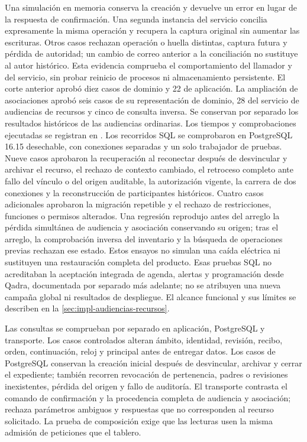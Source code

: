 Una simulación en memoria conserva la creación y devuelve un error en lugar de la respuesta de confirmación. Una segunda instancia del servicio concilia expresamente la misma operación y recupera la captura original sin aumentar las escrituras. Otros casos rechazan operación o huella distintas, captura futura y pérdida de autoridad; un cambio de correo anterior a la conciliación no sustituye al autor histórico. Esta evidencia comprueba el comportamiento del llamador y del servicio, sin probar reinicio de procesos ni almacenamiento persistente. El corte anterior aprobó diez casos de dominio y 22 de aplicación. La ampliación de asociaciones aprobó seis casos de su representación de dominio, 28 del servicio de audiencias de recursos y cinco de consulta inversa. Se conservan por separado los resultados históricos de las audiencias ordinarias. Los tiempos y comprobaciones ejecutadas se registran en . Los recorridos SQL se comprobaron en PostgreSQL 16.15 desechable, con conexiones separadas y un solo trabajador de pruebas. Nueve casos aprobaron la recuperación al reconectar después de desvincular y archivar el recurso, el rechazo de contexto cambiado, el retroceso completo ante fallo del vínculo o del origen auditable, la autorización vigente, la carrera de dos conexiones y la reconstrucción de participantes históricos. Cuatro casos adicionales aprobaron la migración repetible y el rechazo de restricciones, funciones o permisos alterados. Una regresión reprodujo antes del arreglo la pérdida simultánea de audiencia y asociación conservando su origen; tras el arreglo, la comprobación inversa del inventario y la búsqueda de operaciones previas rechazan ese estado. Estos ensayos no simulan una caída eléctrica ni sustituyen una restauración completa del producto. Esas pruebas SQL no acreditaban la aceptación integrada de agenda, alertas y programación desde Qadra, documentada por separado más adelante; no se atribuyen una nueva campaña global ni resultados de despliegue. El alcance funcional y sus límites se describen en la \cref{sec:impl-audiencias-recursos}.

Las consultas se comprueban por separado en aplicación, PostgreSQL y transporte. Los casos controlados alteran ámbito, identidad, revisión, recibo, orden, continuación, reloj y principal antes de entregar datos. Los casos de PostgreSQL conservan la creación inicial después de desvincular, archivar y cerrar el expediente; también recorren revocación de pertenencia, padres o revisiones inexistentes, pérdida del origen y fallo de auditoría. El transporte contrasta el comando de confirmación y la procedencia completa de audiencia y asociación; rechaza parámetros ambiguos y respuestas que no corresponden al recurso solicitado. La prueba de composición exige que las lecturas usen la misma admisión de peticiones que el tablero.

